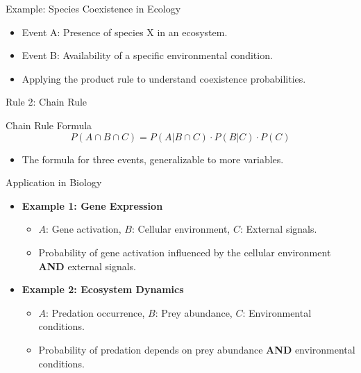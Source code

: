 \documentclass{beamer}
\begin{document}
\begin{frame}{Example: Species Coexistence in Ecology}
  \begin{itemize}
    \item Event A: Presence of species X in an ecosystem.
    \item Event B: Availability of a specific environmental condition.
    \item Applying the product rule to understand coexistence probabilities.
  \end{itemize}
\end{frame}



\begin{frame}{Rule 2: Chain Rule}
  \begin{block}{Chain Rule Formula}
    \[
      P(A \cap B \cap C) = P(A|B \cap C) \cdot P(B|C) \cdot P(C)
    \]
  \end{block}

  \begin{itemize}
    \item The formula for three events, generalizable to more variables.
  \end{itemize}
\end{frame}

\begin{frame}{Application in Biology}
  \begin{itemize}
    \item \textbf{Example 1: Gene Expression}
      \begin{itemize}
        \item $A$: Gene activation, $B$: Cellular environment, $C$: External signals.
        \item Probability of gene activation influenced by the cellular environment {\bf{AND}} external signals.
      \end{itemize}

    \item \textbf{Example 2: Ecosystem Dynamics}
      \begin{itemize}
        \item $A$: Predation occurrence, $B$: Prey abundance, $C$: Environmental conditions.
        \item Probability of predation depends on prey abundance  {\bf{AND}} environmental conditions.
      \end{itemize}
  \end{itemize}
\end{frame}
\end{document}

